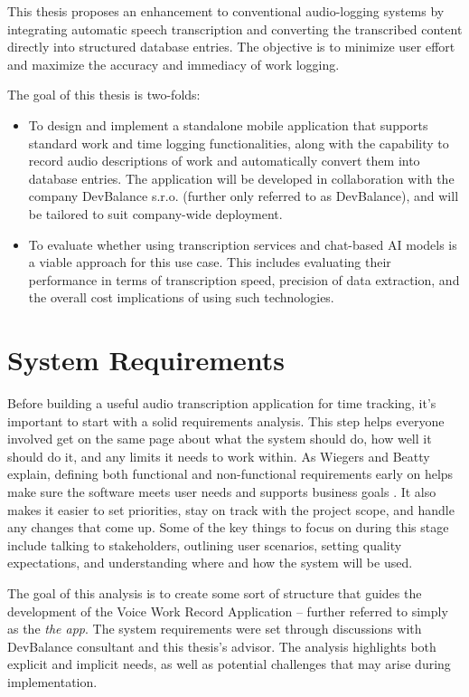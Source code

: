 \documentclass[
  digital,     %
  oneside,     %
  nosansbold,  %
  nocolorbold, %
  lof,         %
  lot,         %
]{fithesis4}
\begin{document}
This thesis proposes an enhancement to conventional audio-logging systems by integrating automatic speech transcription and converting the transcribed content directly into structured database entries. The objective is to minimize user effort and maximize the accuracy and immediacy of work logging.

The goal of this thesis is two-folds:
\begin{itemize}
    \item To design and implement a standalone mobile application that supports standard work and time logging functionalities, along with the capability to record audio descriptions of work and automatically convert them into database entries. The application will be developed in collaboration with the company DevBalance s.r.o. (further only referred to as DevBalance), and will be tailored to suit company-wide deployment.
    \item To evaluate whether using transcription services and chat-based \gls{AI} models is a viable approach for this use case. This includes evaluating their performance in terms of transcription speed, precision of data extraction, and the overall cost implications of using such technologies.
\end{itemize}

\chapter{System Requirements}

Before building a useful audio transcription application for time tracking, it’s important to start with a solid requirements analysis. This step helps everyone involved get on the same page about what the system should do, how well it should do it, and any limits it needs to work within. As Wiegers and Beatty explain, defining both functional and non-functional requirements early on helps make sure the software meets user needs and supports business goals \cite{wiegers13}. It also makes it easier to set priorities, stay on track with the project scope, and handle any changes that come up. Some of the key things to focus on during this stage include talking to stakeholders, outlining user scenarios, setting quality expectations, and understanding where and how the system will be used.

The goal of this analysis is to create some sort of structure that guides the development of the Voice Work Record Application – further referred to simply as the \textit{the app}. The system requirements were set through discussions with DevBalance consultant and this thesis's advisor. The analysis highlights both explicit and implicit needs, as well as potential challenges that may arise during implementation.
\end{document}
